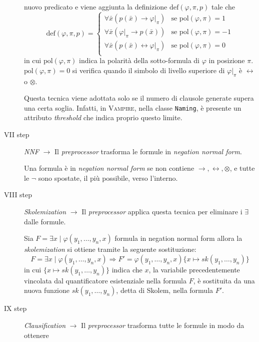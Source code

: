 \begin{description}
\begin{definition}
        nuovo predicato e viene aggiunta la definizione $\text{def}(\varphi,\pi,p)$ tale che
        \[\text{def}(\varphi,\pi,p)=\begin{cases}
            \forall \bar{x} (p(\bar{x})\rightarrow \varphi|_\pi) & \text{se pol}(\varphi,\pi)=1\\
            \forall \bar{x} (\varphi|_\pi\rightarrow p(\bar{x})) & \text{se pol}(\varphi,\pi)=-1\\
            \forall \bar{x} (p(\bar{x})\leftrightarrow \varphi|_\pi) & \text{se pol}(\varphi,\pi)=0\\
        \end{cases}\]
        in cui $\text{pol}(\varphi,\pi)$ indica la polarità della sotto-formula di $\varphi$ in posizione $\pi$. $\text{pol}(\varphi,\pi)=0$ si verifica quando il simbolo di livello superiore di $\varphi|_\pi$ è 
        $\leftrightarrow$ o $\otimes$.   
    \end{definition}
    Questa tecnica viene adottata solo se il numero di clausole generate supera una certa soglia. Infatti, in 
    \textsc{Vampire}, nella classe \verb|Naming|, è presente un attributo \emph{threshold} che indica proprio questo limite.
    \item[VII step] \emph{NNF} $\longrightarrow$ Il \emph{preprocessor} trasforma le formule in \emph{negation normal form}.
    \begin{definition}
        Una formula è in \emph{negation normal form} se non contiene $\rightarrow,\leftrightarrow,\otimes$, e tutte le $\neg$ sono spostate, il più possibile, verso l'interno.
    \end{definition}
    \item[VIII step] \emph{Skolemization} $\longrightarrow$ Il \emph{preprocessor} applica questa tecnica per eliminare i $\exists$ dalle formule.
    \begin{definition}
        Sia $F=\exists x\mid\varphi(y_1,\dots,y_n,x)$ formula in negation normal form allora la \emph{skolemization} si ottiene tramite la seguente sostituzione:
        \[F=\exists x\mid\varphi(y_1,\dots,y_n,x)\Rightarrow F'=\varphi(y_1,\dots,y_n,x)\{x \mapsto sk(y_1,\dots,y_n)\}\]
        in cui $\{x \mapsto sk(y_1,\dots,y_n)\}$ indica che $x$, la variabile precedentemente vincolata dal quantificatore esistenziale nella formula $F$, 
        è sostituita da una nuova funzione $sk(y_1,\dots,y_n)$, detta di Skolem, nella formula $F'$.
    \end{definition}
    \item[IX step] \emph{Clausification} $\longrightarrow$ Il \emph{preprocessor} trasforma tutte le formule in modo da ottenere 

\end{description}
